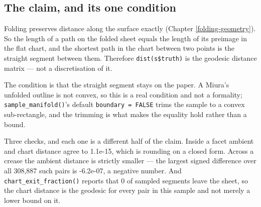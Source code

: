 \documentclass[
  british,
  a4paper,
]{book}
\newenvironment{Shaded}{\begin{snugshade}}{\end{snugshade}}
\newcommand{\CommentTok}[1]{\textcolor[rgb]{0.56,0.35,0.01}{\textit{#1}}}
\newcommand{\FunctionTok}[1]{\textcolor[rgb]{0.13,0.29,0.53}{\textbf{#1}}}
\newcommand{\NormalTok}[1]{#1}
\newcommand{\OtherTok}[1]{\textcolor[rgb]{0.56,0.35,0.01}{#1}}
\newcommand{\SpecialCharTok}[1]{\textcolor[rgb]{0.81,0.36,0.00}{\textbf{#1}}}
\newcommand{\StringTok}[1]{\textcolor[rgb]{0.31,0.60,0.02}{#1}}
\begin{document}
\subsection{The claim, and its one condition}\label{the-claim-and-its-one-condition}

Folding preserves distance along the surface exactly (Chapter
\ref{folding-geometry}). So the length of a path on the folded sheet equals the
length of its preimage in the flat chart, and the shortest path in the chart
between two points is the straight segment between them. Therefore
\texttt{dist(s\$truth)} is the geodesic distance matrix --- not a discretisation of it.

The condition is that the straight segment stays on the paper. A Miura's
unfolded outline is not convex, so this is a real condition and not a
formality; \texttt{sample\_manifold()}'s default \texttt{boundary\ =\ FALSE} trims the sample to a
convex sub-rectangle, and the trimming is what makes the equality hold rather
than a bound.

\begin{Shaded}
\end{Shaded}

Three checks, and each one is a different half of the claim. Inside a facet
ambient and chart distance agree to 1.1e-15, which is rounding on a
closed form. Across a crease the ambient distance is strictly smaller --- the
largest signed difference over all 308,887
such pairs is -6.2e-07, a negative number. And
\texttt{chart\_exit\_fraction()} reports that 0 of sampled segments leave the
sheet, so the chart distance is the geodesic for every pair in this sample and
not merely a lower bound on it.
\end{document}
